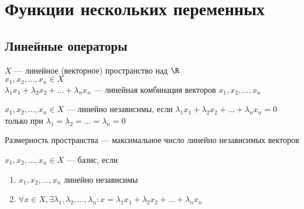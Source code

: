 \chapter{Функции нескольких переменных}
\section{Линейные операторы}

\begin{Def}
	$X$ --- линейное (векторное) пространство над $\R$ \\
	$x_1, x_2, ..., x_n \in X$\\
	$\lambda_1x_1 + \lambda_2x_2 + \dots + \lambda_nx_n$ --- линейная комбинация векторов $x_1, x_2, \dots, x_n$
\end{Def}

\begin{Def}
	$x_1, x_2, ..., x_n \in X$ --- линейно независимы, если
	$\lambda_1x_1 + \lambda_2x_2 + \dots + \lambda_nx_n = 0$ только при $\lambda_1 = \lambda_2 = \dots = \lambda_n = 0$
\end{Def}

\begin{Def}
	Размерность пространства --- максимальное число линейно независимых векторов
\end{Def}

\begin{Def}
	$x_1, x_2, ..., x_n \in X$ --- базис, если
	\begin{enumerate}
	\item
		$x_1, x_2, ..., x_n$ линейно независимы
	\item
		$\forall x \in X, \exists \lambda_1, \lambda_2, \dots, \lambda_n \colon x = \lambda_1x_1 + \lambda_2x_2 + \dots + \lambda_nx_n$
	\end{enumerate}
\end{Def}

